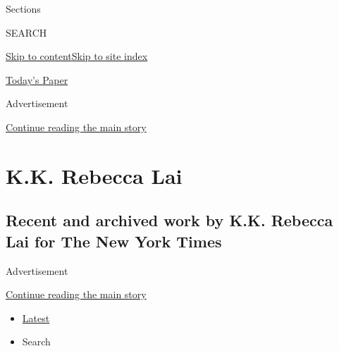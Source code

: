 Sections

SEARCH

\protect\hyperlink{site-content}{Skip to
content}\protect\hyperlink{site-index}{Skip to site index}

\href{https://myaccount.nytimes.com/auth/login?response_type=cookie\&client_id=vi}{}

\href{https://www.nytimes.com/section/todayspaper}{Today's Paper}

Advertisement

\protect\hyperlink{after-top}{Continue reading the main story}

\hypertarget{kk-rebecca-lai}{%
\section{K.K. Rebecca Lai}\label{kk-rebecca-lai}}

\hypertarget{recent-and-archived-work-by-kk-rebecca-lai-for-the-new-york-times}{%
\subsection{Recent and archived work by K.K. Rebecca Lai for The New
York
Times}\label{recent-and-archived-work-by-kk-rebecca-lai-for-the-new-york-times}}

Advertisement

\protect\hyperlink{after-mid1}{Continue reading the main story}

\begin{itemize}
\tightlist
\item
  \protect\hyperlink{stream-panel}{Latest}
\item
  Search
\end{itemize}


